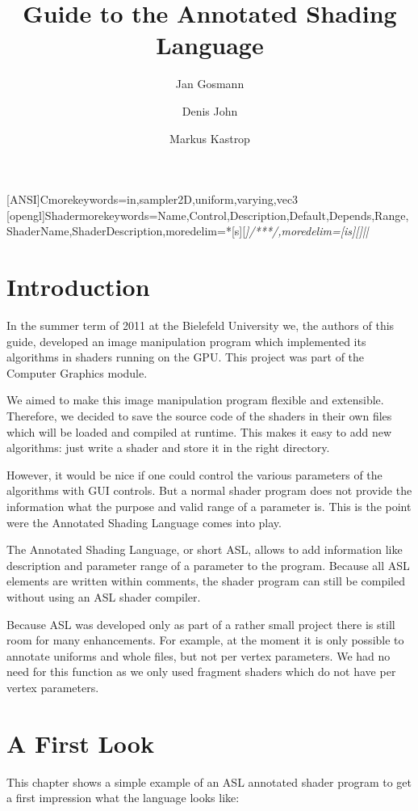 \documentclass[11pt,a4paper]{scrreprt}
\title{Guide to the Annotated Shading Language}
\author{Jan Gosmann \and Denis John \and Markus Kastrop}
\begin{document}
[ANSI]{C}{morekeywords={in,sampler2D,uniform,varying,vec3}}
[opengl]{Shader}{morekeywords={Name,Control,Description,Default,Depends,Range,ShaderName,ShaderDescription},moredelim=*[s][\itshape]{/**}{*/},moredelim=[is][\itshape]{|}{|}}
\maketitle
\tableofcontents

\chapter{Introduction}
In the summer term of 2011 at the Bielefeld University we, the authors of this 
guide, developed an image manipulation program which implemented its algorithms 
in shaders running on the GPU. This project was part of the Computer Graphics 
module.

We aimed to make this image manipulation program flexible and extensible.  
Therefore, we decided to save the source code of the shaders in their own files 
which will be loaded and compiled at runtime. This makes it easy to add new 
algorithms: just write a shader and store it in the right directory.

However, it would be nice if one could control the various parameters of the 
algorithms with GUI controls. But a normal shader program does not provide the 
information what the purpose and valid range of a parameter is. This is the 
point were the Annotated Shading Language comes into play.

The Annotated Shading Language, or short ASL, allows to add information like 
description and parameter range of a parameter to the program. Because all ASL 
elements are written within comments, the shader program can still be compiled 
without using an ASL shader compiler.

Because ASL was developed only as part of a rather small project there is still 
room for many enhancements. For example, at the moment it is only possible to 
annotate uniforms and whole files, but not per vertex parameters. We had no need 
for this function as we only used fragment shaders which do not have per vertex 
parameters.


\chapter{A First Look}
This chapter shows a simple example of an ASL annotated shader program to get 
a first impression what the language looks like:
\end{document}
